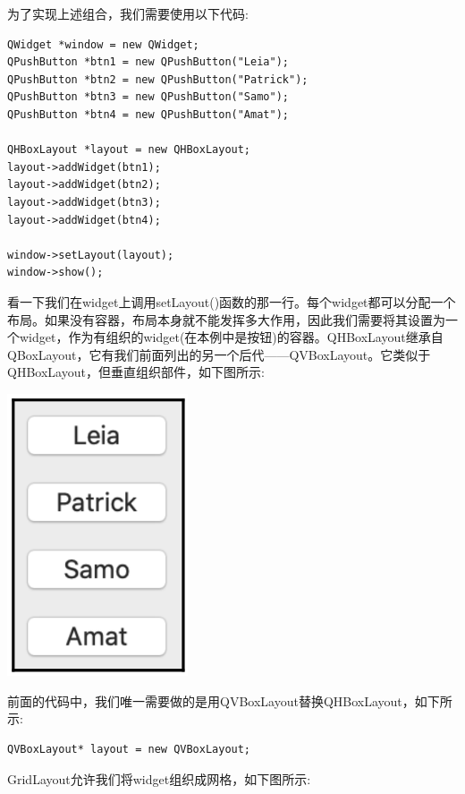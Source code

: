 为了实现上述组合，我们需要使用以下代码: \par

\begin{lstlisting}[caption={}]
QWidget *window = new QWidget;
QPushButton *btn1 = new QPushButton("Leia");
QPushButton *btn2 = new QPushButton("Patrick");
QPushButton *btn3 = new QPushButton("Samo");
QPushButton *btn4 = new QPushButton("Amat");

QHBoxLayout *layout = new QHBoxLayout;
layout->addWidget(btn1);
layout->addWidget(btn2);
layout->addWidget(btn3);
layout->addWidget(btn4);

window->setLayout(layout);
window->show();
\end{lstlisting}

看一下我们在widget上调用setLayout()函数的那一行。每个widget都可以分配一个布局。如果没有容器，布局本身就不能发挥多大作用，因此我们需要将其设置为一个widget，作为有组织的widget(在本例中是按钮)的容器。QHBoxLayout继承自QBoxLayout，它有我们前面列出的另一个后代——QVBoxLayout。它类似于QHBoxLayout，但垂直组织部件，如下图所示: \par

\begin{center}
	\includegraphics[width=0.4\textwidth]{content/Section-2/Chapter-14/17}
\end{center}

前面的代码中，我们唯一需要做的是用QVBoxLayout替换QHBoxLayout，如下所示: \par

\begin{lstlisting}[caption={}]
QVBoxLayout* layout = new QVBoxLayout;
\end{lstlisting}

GridLayout允许我们将widget组织成网格，如下图所示: \par

